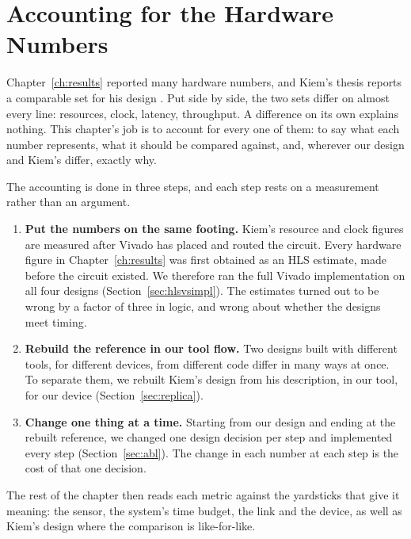 \chapter{Accounting for the Hardware Numbers}
\label{ch:interpret}

Chapter~\ref{ch:results} reported many hardware numbers, and Kiem's thesis
reports a comparable set for his design \cite{kiem2025}. Put side by side, the
two sets differ on almost every line: resources, clock, latency, throughput.
A difference on its own explains nothing. This chapter's job is to account for
every one of them: to say what each number represents, what it should be
compared against, and, wherever our design and Kiem's differ, exactly why.

The accounting is done in three steps, and each step rests on a measurement
rather than an argument.

\begin{enumerate}
\item \textbf{Put the numbers on the same footing.} Kiem's resource and clock
figures are measured after Vivado has placed and routed the circuit. Every hardware figure in
Chapter~\ref{ch:results} was first obtained as an HLS estimate, made before the
circuit existed. We therefore ran the full Vivado implementation on all four
designs (Section~\ref{sec:hlsvsimpl}). The estimates turned out to be wrong by
a factor of three in logic, and wrong about whether the designs meet timing.
\item \textbf{Rebuild the reference in our tool flow.} Two designs built with
different tools, for different devices, from different code differ in many ways
at once. To separate them, we rebuilt Kiem's design from his description, in
our tool, for our device (Section~\ref{sec:replica}).
\item \textbf{Change one thing at a time.} Starting from our design and ending
at the rebuilt reference, we changed one design decision per step and
implemented every step (Section~\ref{sec:abl}). The change in each number at
each step is the cost of that one decision.
\end{enumerate}

\noindent
The rest of the chapter then reads each metric against the yardsticks that give
it meaning: the sensor, the system's time budget, the link and the device, as
well as Kiem's design where the comparison is like-for-like.

